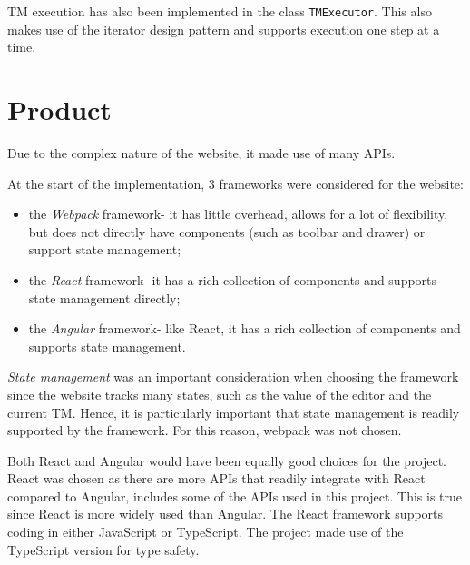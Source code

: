 TM execution has also been implemented in the class \texttt{TMExecutor}. This also makes use of the iterator design pattern and supports execution one step at a time.

\section{Product}
Due to the complex nature of the website, it made use of many APIs.

At the start of the implementation, 3 frameworks were considered for the website:
\begin{itemize}
    \item the \emph{Webpack} framework- it has little overhead, allows for a lot of flexibility, but does not directly have components (such as toolbar and drawer) or support state management;
    \item the \emph{React} framework- it has a rich collection of components and supports state management directly;
    \item the \emph{Angular} framework- like React, it has a rich collection of components and supports state management.
\end{itemize}

\emph{State management} was an important consideration when choosing the framework since the website tracks many states, such as the value of the editor and the current TM. Hence, it is particularly important that state management is readily supported by the framework. For this reason, webpack was not chosen.

Both React and Angular would have been equally good choices for the project. React was chosen as there are more APIs that readily integrate with React compared to Angular, includes some of the APIs used in this project. This is true since React is more widely used than Angular.
The React framework supports coding in either JavaScript or TypeScript. The project made use of the TypeScript version for type safety.


